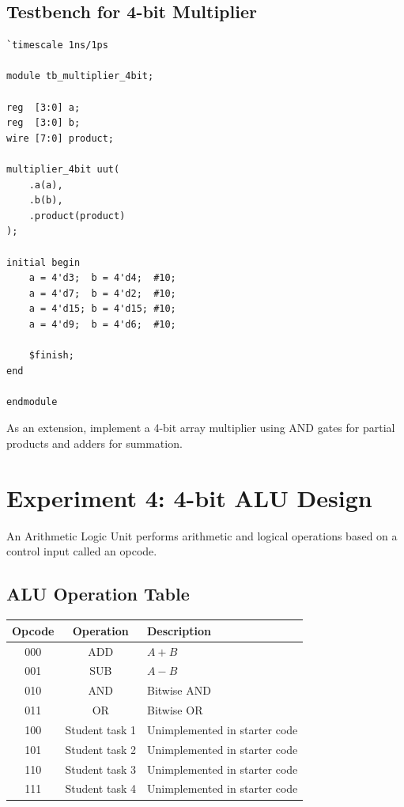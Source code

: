 \documentclass[11pt,a4paper]{article}
\begin{document}
\subsection{Testbench for 4-bit Multiplier}

\begin{lstlisting}[caption={Testbench for 4-bit multiplier}]
`timescale 1ns/1ps

module tb_multiplier_4bit;

reg  [3:0] a;
reg  [3:0] b;
wire [7:0] product;

multiplier_4bit uut(
    .a(a),
    .b(b),
    .product(product)
);

initial begin
    a = 4'd3;  b = 4'd4;  #10;
    a = 4'd7;  b = 4'd2;  #10;
    a = 4'd15; b = 4'd15; #10;
    a = 4'd9;  b = 4'd6;  #10;

    $finish;
end

endmodule
\end{lstlisting}

\begin{exercisebox}
As an extension, implement a 4-bit array multiplier using AND gates for partial products and adders for summation.
\end{exercisebox}

\section{Experiment 4: 4-bit ALU Design}

An Arithmetic Logic Unit performs arithmetic and logical operations based on a control input called an opcode.

\subsection{ALU Operation Table}

\begin{center}
\renewcommand{\arraystretch}{1.25}
\begin{tabular}{ccl}
\toprule
\textbf{Opcode} & \textbf{Operation} & \textbf{Description} \\
\midrule
000 & ADD & $A + B$ \\
001 & SUB & $A - B$ \\
010 & AND & Bitwise AND \\
011 & OR  & Bitwise OR \\
100 & Student task 1 & Unimplemented in starter code \\
101 & Student task 2 & Unimplemented in starter code \\
110 & Student task 3 & Unimplemented in starter code \\
111 & Student task 4 & Unimplemented in starter code \\
\bottomrule
\end{tabular}
\end{center}
\end{document}
